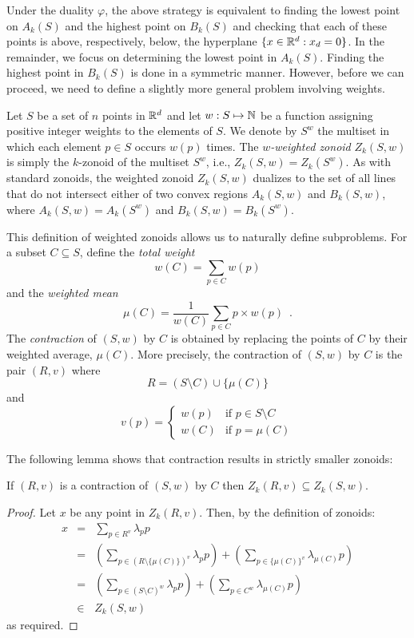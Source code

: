 \documentclass[lotsofwhite]{patmorin}
\newcommand{\dual}{\varphi}
\begin{document}
Under the duality $\dual$, the above strategy is equivalent to finding
the lowest point on $A_k(S)$ and the highest point on $B_k(S)$ and
checking that each of these points is above, respectively, below, the
hyperplane $\{x\in\mathbb{R}^d:x_d=0\}$.  In the remainder, we focus on
determining the lowest point in $A_k(S)$.  Finding the highest point
in $B_k(S)$ is done in a symmetric manner.  However, before we can
proceed, we need to define a slightly more general problem involving
weights.

Let $S$ be a set of $n$ points in $\mathbb{R}^d$ and let $w:S\mapsto\mathbb{N}$ be a
function assigning positive integer weights to the elements of $S$.
We denote by $S^w$ the multiset in which each element $p\in S$ occurs
$w(p)$ times.  The \emph{$w$-weighted zonoid} $Z_k(S,w)$ is simply the
$k$-zonoid of the multiset $S^w$, i.e., $Z_k(S,w)=Z_k(S^w)$.  As with
standard zonoids, the weighted zonoid $Z_k(S,w)$ dualizes to the set
of all lines that do not intersect either of two convex regions
$A_k(S,w)$ and $B_k(S,w)$, where $A_k(S,w)=A_k(S^w)$ and
$B_k(S,w)=B_k(S^w)$.

This definition of weighted zonoids allows us to naturally define
subproblems.  For a subset $C\subseteq S$, define the \emph{total
weight}
\[
       w(C)=\sum_{p\in C}w(p)
\]
and the \emph{weighted mean}
\[ 
       \mu(C)=\frac{1}{w(C)}\sum_{p\in C} p\times w(p) \enspace .
\]
The \emph{contraction} of
$(S,w)$ by $C$ is obtained by replacing the points of $C$ by their
weighted average, $\mu(C)$.  More precisely, the contraction of
$(S,w)$ by $C$ is the pair $(R,v)$ where 
\[ R = (S\setminus C) \cup \{ \mu(C) \} \] 
and 
\[ v(p) = \left\{\begin{array}{ll} 
        w(p) & \mbox{if $p\in S\setminus C$} \\ 
        w(C) & \mbox{if $p=\mu(C)$} \end{array}\right.
\]

The following lemma shows that contraction results in strictly smaller
zonoids:

\begin{lem}
If $(R,v)$ is a contraction of $(S,w)$ by $C$ then $Z_k(R,v)
\subseteq Z_k(S,w)$.
\end{lem}

\begin{proof}
Let $x$ be any point in $Z_k(R,v)$.  Then, by the definition of
zonoids:
\begin{eqnarray*}
    x &=& \sum_{p\in R^v} \lambda_pp \\
      &=& \left( \sum_{p\in (R\setminus \{\mu(C)\})^v} \lambda_pp \right)
          + \left( \sum_{p\in \{\mu(C)\}^v}\lambda_{\mu(C)}p \right) \\
      &=& \left(\sum_{p\in (S\setminus C)^w} \lambda_pp \right)
          + \left(\sum_{p\in C^w}\lambda_{\mu(C)} p\right) \\
      &\in& Z_k(S,w)
\end{eqnarray*}
as required.
\end{proof}
\end{document}
